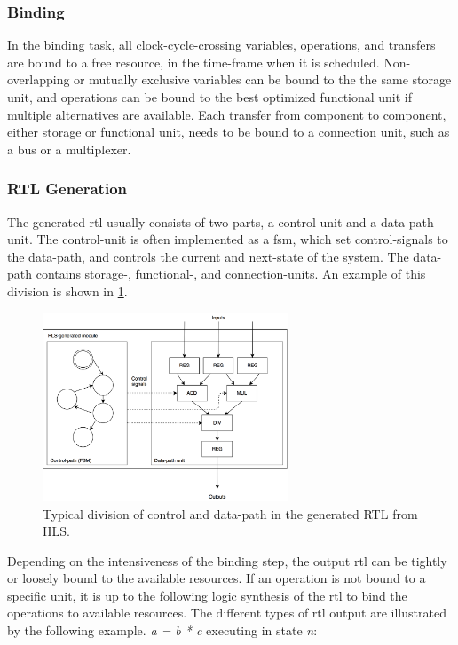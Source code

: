 \subsubsection{Binding}
In the binding task, all clock-cycle-crossing variables, operations, and transfers are bound to a free resource, in the time-frame when it is scheduled. Non-overlapping or mutually exclusive variables can be bound to the the same storage unit, and operations can be bound to the best optimized functional unit if multiple alternatives are available. Each transfer from component to component, either storage or functional unit, needs to be bound to a connection unit, such as a bus or a multiplexer.
\subsubsection{RTL Generation}
The generated \gls{rtl} usually consists of two parts, a control-unit and a data-path-unit. The control-unit is often implemented as a \gls{fsm}, which set control-signals to the data-path, and controls the current and next-state of the system. The data-path contains storage-, functional-, and connection-units. An example of this division is shown in \cref{fig:hlsrtl}.
\begin{figure}[hbpt]
\centering
\includegraphics[width=0.65\textwidth]{../figs/HLSRTL.png}
\caption{\label{fig:hlsrtl}Typical division of control and data-path in the generated RTL from HLS.}
\end{figure}
Depending on the intensiveness of the binding step, the output \gls{rtl} can be tightly or loosely bound to the available resources. If an operation is not bound to a specific unit, it is up to the following logic synthesis of the \gls{rtl} to bind the operations to available resources. The different types of \gls{rtl} output are illustrated by the following example. \textit{a = b * c} executing in state \textit{n}:

